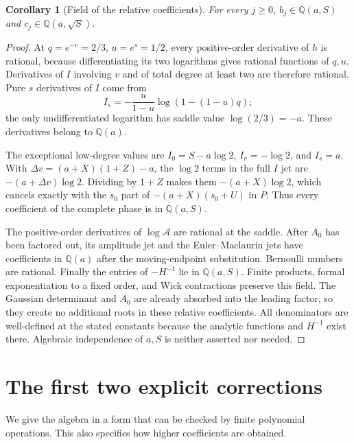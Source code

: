 \documentclass[11pt,letterpaper]{article}
\numberwithin{equation}{section}
\newtheorem{corollary}[theorem]{Corollary}
\theoremstyle{definition}\newtheorem{definition}[theorem]{Definition}
\theoremstyle{remark}\newtheorem{remark}[theorem]{Remark}
\begin{document}
\begin{corollary}[Field of the relative coefficients]\label{mss:cor:field}
For every $j\ge0$, $b_j\in\mathbb Q(a,S)$ and $c_j\in\mathbb Q(a,\sqrt S)$.
\end{corollary}
\begin{proof}
At $q=e^{-v}=2/3$, $u=e^s=1/2$, every positive-order derivative of $h$ is rational, because differentiating its two logarithms gives rational functions of $q,u$. Derivatives of $I$ involving $v$ and of total degree at least two are therefore rational. Pure $s$ derivatives of $I$ come from
\[
I_s=-\frac{u}{1-u}\log(1-(1-u)q);
\]
the only undifferentiated logarithm has saddle value $\log(2/3)=-a$. These derivatives belong to $\mathbb Q(a)$.

The exceptional low-degree values are $I_0=S-a\log2$, $I_v=-\log2$, and $I_s=a$. With $\Delta v=(a+X)(1+Z)-a$, the $\log2$ terms in the full $I$ jet are $-(a+\Delta v)\log2$. Dividing by $1+Z$ makes them $-(a+X)\log2$, which cancels exactly with the $s_0$ part of $-(a+X)(s_0+U)$ in $P$. Thus every coefficient of the complete phase is in $\mathbb Q(a,S)$.

The positive-order derivatives of $\log\mathcal A$ are rational at the saddle. After $A_0$ has been factored out, its amplitude jet and the Euler--Maclaurin jets have coefficients in $\mathbb Q(a)$ after the moving-endpoint substitution. Bernoulli numbers are rational. Finally the entries of $-H^{-1}$ lie in $\mathbb Q(a,S)$. Finite products, formal exponentiation to a fixed order, and Wick contractions preserve this field. The Gaussian determinant and $A_0$ are already absorbed into the leading factor, so they create no additional roots in these relative coefficients. All denominators are well-defined at the stated constants because the analytic functions and $H^{-1}$ exist there. Algebraic independence of $a,S$ is neither asserted nor needed.
\end{proof}

\section{The first two explicit corrections}\label{mss:sec:first}
We give the algebra in a form that can be checked by finite polynomial operations. This also specifies how higher coefficients are obtained.
\end{document}
